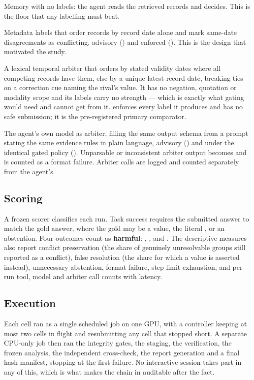 \begin{description}[leftmargin=3.2em,itemsep=1.5pt,topsep=2pt,font=\normalfont\sffamily]
\item[\cond{B}] Memory with no labels: the agent reads the retrieved records and decides. This is the floor that
any labelling must beat.
\item[\cond{G}, \cond{R}] Metadata labels that order records by record date alone and mark same-date
disagreements as conflicting, advisory () and enforced (). This is the design that motivated the
study.
\item[\cond{T}, \cond{RT}] A lexical temporal arbiter that orders by stated validity dates where all competing
records have them, else by a unique latest record date, breaking ties on a correction cue naming the rival's
value. It has no negation, quotation or modality scope and its labels carry no strength --- which is exactly what
gating would need and cannot get from it.  enforces every label it produces and has no safe submission;
it is the pre-registered primary comparator.
\item[\cond{LA}, \cond{LG}] The agent's own model as arbiter, filling the same output schema from a prompt
stating the same evidence rules in plain language, advisory () and under the identical gated policy
(). Unparsable or inconsistent arbiter output becomes  and is counted as a format
failure. Arbiter calls are logged and counted separately from the agent's.
\end{description}

\subsection{Scoring}

A frozen scorer classifies each run. Task success requires the submitted answer to match the gold answer, where the
gold may be a value, the literal , or an abstention. Four outcomes count as \textbf{harmful}:
, ,  and . The descriptive
measures also report conflict preservation (the share of genuinely unresolvable groups still reported as a
conflict), false resolution (the share for which a value is asserted instead), unnecessary abstention, format
failure, step-limit exhaustion, and per-run tool, model and arbiter call counts with latency.

\subsection{Execution}

Each cell ran as a single scheduled job on one GPU, with a controller keeping at most two cells in flight and
resubmitting any cell that stopped short. A separate CPU-only job then ran the integrity gates, the staging, the
verification, the frozen analysis, the independent cross-check, the report generation and a final hash manifest,
stopping at the first failure. No interactive session takes part in any of this, which is what makes the chain in
 auditable after the fact.
